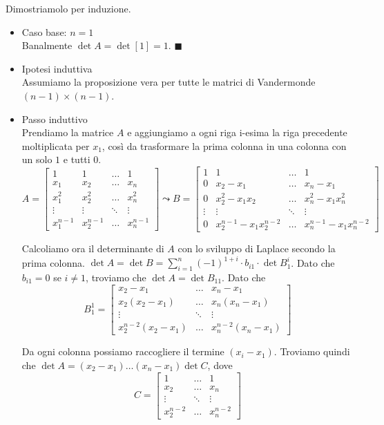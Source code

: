 \documentclass[11pt, a4paper, titlepage, oneside]{scrbook}
\begin{document}
Dimostriamolo per induzione. 
\begin{itemize}
    \item Caso base: $n = 1$ \\
    Banalmente $\det A = \det [1] = 1$. $\blacksquare$
    \item Ipotesi induttiva \\
    Assumiamo la proposizione vera per tutte le matrici di Vandermonde $(n-1) \times (n-1)$. 
    \item Passo induttivo \\
    Prendiamo la matrice $A$ e aggiungiamo a ogni riga i-esima la riga precedente moltiplicata per $x_1$, così da trasformare la prima colonna in una colonna con un solo $1$ e tutti $0$. 
    \[ A = 
    \begin{bmatrix}
        1 & 1 & \dots & 1 \\
        x_1 & x_2 & \dots & x_n \\
        x_1^2 & x_2^2 & \dots & x_n^2 \\
        \vdots & \vdots & \ddots & \vdots \\
        x_1^{n-1} & x_2^{n-1} & \dots & x_n^{n-1}
    \end{bmatrix}
    \leadsto  B = 
    \begin{bmatrix}
        1  & 1 & \dots & 1 \\
        0 & x_2 - x_1 & \dots & x_n - x_1 \\
        0 & x_2^2 - x_1 x_2 & \dots & x_n^2 - x_1 x_n^2 \\
        \vdots & \vdots & \ddots & \vdots \\
        0 & x_2^{n-1} - x_1 x_2^{n-2} & \dots & x_n^{n-1} - x_1 x_n^{n-2}
    \end{bmatrix}    
    \]

    Calcoliamo ora il determinante di $A$ con lo sviluppo di Laplace secondo la prima colonna. \mbox{$\det A = \det B = \sum_{i = 1}^n(-1)^{1+i} \cdot b_{i1} \cdot \det B^i_1$}. Dato che $b_{i1} = 0$ se $i \neq 1$, troviamo che \mbox{$\det A = \det B_{11}$}. Dato che
    \[
    B_1^1 = \begin{bmatrix}
        x_2 - x_1 & \dots & x_n - x_1 \\
        x_2 ( x_2 - x_1) & \dots & x_n (x_n - x_1) \\ 
        \vdots & \ddots & \vdots \\
        x_2^{n-2} ( x_2 - x_1) & \dots & x_n^{n-2} (x_n - x_1)
    \end{bmatrix}
    \]

Da ogni colonna possiamo raccogliere il termine $(x_i - x_1)$. Troviamo quindi che \mbox{$\det A = (x_2 - x_1) \dots (x_n - x_1) \det C$}, dove
\[
C = \begin{bmatrix}
    1 & \dots & 1 \\
    x_2 & \dots & x_n \\
    \vdots & \ddots & \vdots \\
    x_2^{n-2} & \dots & x_n^{n-2}
\end{bmatrix}
\]
\end{itemize}
\end{document}
